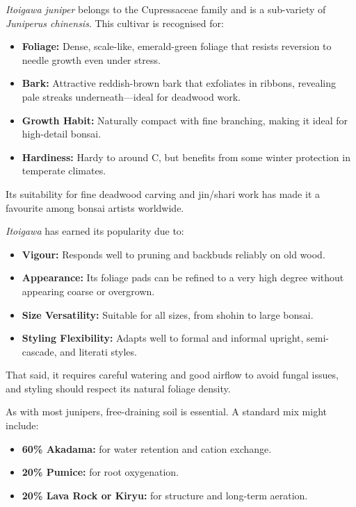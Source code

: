 \medskip
{}
\noindent
\textit{Itoigawa juniper} belongs to the Cupressaceae family and is a sub\--variety of \textit{Juniperus chinensis}.
This cultivar is recognised for:

\begin{itemize}
    \item \textbf{Foliage:} Dense, scale\--like, emerald\--green foliage that resists reversion to needle growth even under stress.

    \item \textbf{Bark:} Attractive reddish\--brown bark that exfoliates in ribbons, revealing pale streaks underneath---ideal for deadwood work.

    \item \textbf{Growth Habit:} Naturally compact with fine branching, making it ideal for high\--detail bonsai.

    \item \textbf{Hardiness:} Hardy to around \textdegree C, but benefits from some winter protection in temperate climates.
\end{itemize}

Its suitability for fine deadwood carving and jin/shari work has made it a favourite among bonsai artists worldwide.

\medskip
{}
\noindent
\textit{Itoigawa} has earned its popularity due to:

\begin{itemize}
    \item \textbf{Vigour:} Responds well to pruning and backbuds reliably on old wood.

    \item \textbf{Appearance:} Its foliage pads can be refined to a very high degree without appearing coarse or overgrown.

    \item \textbf{Size Versatility:} Suitable for all sizes, from shohin to large bonsai.

    \item \textbf{Styling Flexibility:} Adapts well to formal and informal upright, semi\--cascade, and literati styles.
\end{itemize}

That said, it requires careful watering and good airflow to avoid fungal issues, and styling should respect its natural foliage density.

\medskip
{}
\noindent
As with most junipers, free\--draining soil is essential.
A standard mix might include:
\begin{itemize}
    \item \textbf{60\% Akadama:} for water retention and cation exchange.

    \item \textbf{20\% Pumice:} for root oxygenation.

    \item \textbf{20\% Lava Rock or Kiryu:} for structure and long\--term aeration.
\end{itemize}

